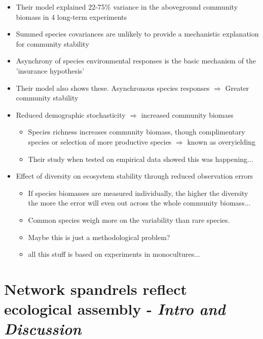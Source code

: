 \documentclass[11pt]{article}
\begin{document}
	\begin{itemize}
		\item Their model explained 22-75\% variance in the aboveground community biomass in 4 long-term experiments
		\item Summed species covariances are unlikely to provide a mechanistic explanation for community stability
		\item Asynchrony of species environmental responses is the basic mechanism of the 'insurance hypothesis'
		\item Their model also shows these. Asynchronous species responses $\Rightarrow$ Greater community stability
		\item Reduced demographic stochasticity $\Rightarrow$ increased community biomass
		\begin{itemize}
			\item Species richness increases community biomass, though complimentary species or selection of more productive species $\Rightarrow$ known as overyielding
			\item Their study when tested on empirical data showed this was happening...
		\end{itemize}
		\item Effect of diversity on ecosystem stability through reduced observation errors
		\begin{itemize}
			\item If species biomasses are measured individually, the higher the diversity the more the error will even out across the whole community biomass...
			\item Common species weigh more on the variability than rare species.
			\item Maybe this is just a methodological problem?
			\item all this stuff is based on experiments in monocultures...
		\end{itemize}
	\end{itemize}

	
	\section*{Network spandrels reflect ecological assembly \citep{Maynard2018} - \textit{Intro  and Discussion}}
	
\end{document}
